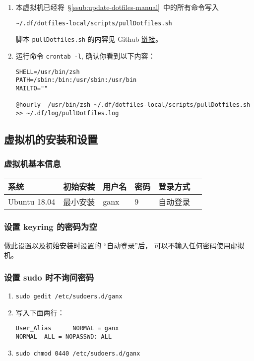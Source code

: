 \documentclass[
    11pt,
    base=hide,
    cite=authoryear,
    device=phone,
    lang=cn,
    mode=simple,
    result=answer,
    toc=onecol,
]{elegantbook_sierxue}
\begin{document}
\begin{enumerate}
    \item 本虚拟机已经将~\S\ref{ssub:update-dotfiles-manual}~中的所有命令写入
\begin{lstlisting}[style=lst]
~/.df/dotfiles-local/scripts/pullDotfiles.sh
\end{lstlisting}
        脚本 \lstinline{pullDotfiles.sh} 的内容见 Github
        \href{https://github.com/sierxue/scripts/blob/master/pullDotfiles.sh}
        {链接}。
    \item 运行命令 \lstinline{crontab -l}, 确认你看到以下内容：
\begin{lstlisting}[style=lst]
SHELL=/usr/bin/zsh
PATH=/sbin:/bin:/usr/sbin:/usr/bin
MAILTO=""

@hourly  /usr/bin/zsh ~/.df/dotfiles-local/scripts/pullDotfiles.sh >> ~/.df/log/pullDotfiles.log
\end{lstlisting}
\end{enumerate}

\subsection{虚拟机的安装和设置}%
\label{sub:vbox-vm-install-set}

\subsubsection{虚拟机基本信息}%
\label{ssub:linux-ubuntu}

\begin{table}[H]
   \centering
     \begin{tabular}{llllll}
     \toprule
     系统 & 初始安装 & 用户名 & 密码 & 登录方式 \\
     \midrule
     Ubuntu 18.04 & 最小安装 & ganx   & 9 & 自动登录\\
     \bottomrule
     \end{tabular}%
   \label{tab:theorem-class}%
\end{table}%

\subsubsection{设置 keyring 的密码为空}%
\label{ssub:vm-keyring}

做此设置以及初始安装时设置的 ``自动登录''后，
可以不输入任何密码使用虚拟机。

\subsubsection{设置 sudo 时不询问密码}%
\label{ssub:vm-sudo}
\begin{enumerate}
    \item \lstinline{sudo gedit /etc/sudoers.d/ganx}
    \item 写入下面两行：
\begin{lstlisting}[style=lst]
User_Alias      NORMAL = ganx
NORMAL  ALL = NOPASSWD: ALL
\end{lstlisting}
    \item \lstinline{sudo chmod 0440 /etc/sudoers.d/ganx}
\end{enumerate}
\end{document}
